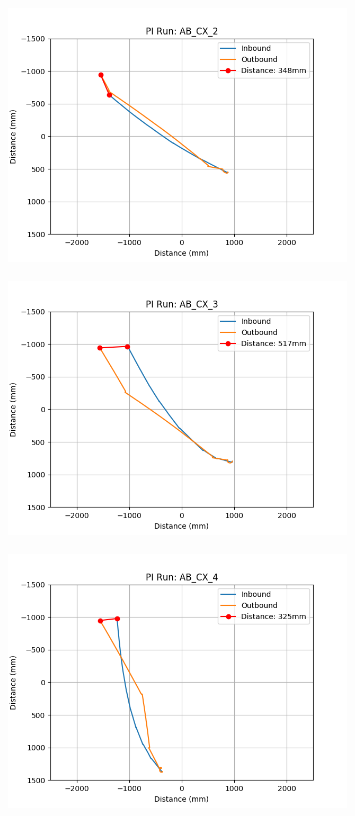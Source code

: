 \documentclass[a4paper,11pt,twoside,openright]{article}
\begin{document}
\begin{figure}[h!]
  \centering
  \includegraphics[width=0.8\textwidth]{AB_CX_2}
  \caption{\label{fig:abcx2}}
\end{figure}

\begin{figure}[h!]
  \centering
  \includegraphics[width=0.8\textwidth]{AB_CX_3}
  \caption{\label{fig:abcx3}}
\end{figure}

\begin{figure}[h!]
  \centering
  \includegraphics[width=0.8\textwidth]{AB_CX_4}
  \caption{\label{fig:abcx4}}
\end{figure}
\end{document}
